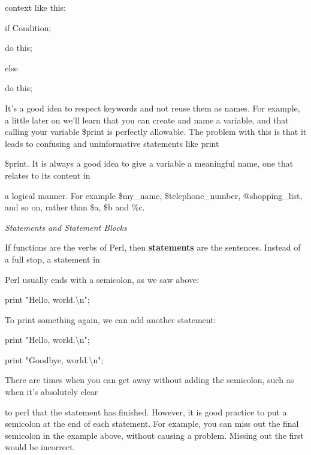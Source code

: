 \documentclass[a4paper,11pt]{book}
\begin{document}
\noindent context like this:

\noindent 

\noindent if Condition;

\noindent do this;

\noindent 

\noindent else

\noindent do this;

\noindent 

\noindent It's a good idea to respect keywords and not reuse them as names. For example, a little later on we'll learn that you can create and name a variable, and that calling your variable \$print is perfectly allowable. The problem with this is that it leads to confusing and uninformative statements like print

\noindent \$print. It is always a good idea to give a variable a meaningful name, one that relates to its content in

\noindent a logical manner. For example \$my\_name, \$telephone\_number, @shopping\_list, and so on, rather than \$a, \$b and \%c.

\noindent 

\noindent \textit{Statements and Statement Blocks}

\noindent If functions are the verbs of Perl, then \textbf{statements }are the sentences. Instead of a full stop, a statement in

\noindent Perl usually ends with a semicolon, as we saw above:

\noindent 

\noindent 

\noindent print "Hello, world.\textbackslash n";

\noindent 

\noindent To print something again, we can add another statement:

\noindent 

\noindent 

\noindent print "Hello, world.\textbackslash n";

\noindent print "Goodbye, world.\textbackslash n";

\noindent 

\noindent There are times when you can get away without adding the semicolon, such as when it's absolutely clear

\noindent to perl that the statement has finished. However, it is good practice to put a semicolon at the end of each statement. For example, you can miss out the final semicolon in the example above, without causing a problem. Missing out the first would be incorrect.
\end{document}
